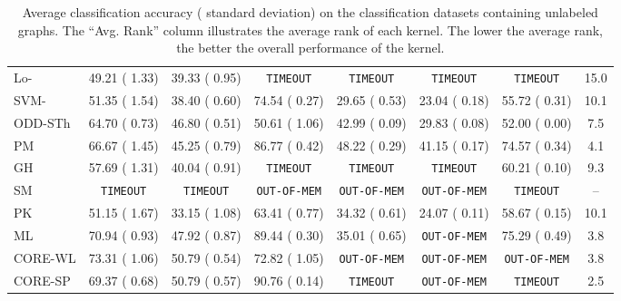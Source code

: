 \documentclass[twoside,11pt]{article}
\begin{document}
\begin{table}[t]
\begin{sc}
{\begin{tabular}{lccccccc}
Lo- & 49.21 {\tiny ( 1.33)} & 39.33 {\tiny ( 0.95)} & \texttt{TIMEOUT} & \texttt{TIMEOUT} & \texttt{TIMEOUT} & \texttt{TIMEOUT} & 15.0 \\ 
SVM- & 51.35 {\tiny ( 1.54)} & 38.40 {\tiny ( 0.60)} & 74.54 {\tiny ( 0.27)} & 29.65 {\tiny ( 0.53)} & 23.04 {\tiny ( 0.18)} & 55.72 {\tiny ( 0.31)} & 10.1 \\ 
ODD-STh & 64.70 {\tiny ( 0.73)} & 46.80 {\tiny ( 0.51)} & 50.61 {\tiny ( 1.06)} & 42.99 {\tiny ( 0.09)} & 29.83 {\tiny ( 0.08)} & 52.00 {\tiny ( 0.00)} & 7.5 \\ 
PM & 66.67 {\tiny ( 1.45)} & 45.25 {\tiny ( 0.79)} & 86.77 {\tiny ( 0.42)} & 48.22 {\tiny ( 0.29)} & 41.15 {\tiny ( 0.17)} & 74.57 {\tiny ( 0.34)} & 4.1 \\ 
GH & 57.69 {\tiny ( 1.31)} & 40.04 {\tiny ( 0.91)} & \texttt{TIMEOUT} & \texttt{TIMEOUT} & \texttt{TIMEOUT} & 60.21 {\tiny ( 0.10)} & 9.3 \\ 
SM & \texttt{TIMEOUT} & \texttt{TIMEOUT} & \texttt{OUT-OF-MEM} & \texttt{OUT-OF-MEM} & \texttt{OUT-OF-MEM} & \texttt{TIMEOUT} & -- \\ 
PK & 51.15 {\tiny ( 1.67)} & 33.15 {\tiny ( 1.08)} & 63.41 {\tiny ( 0.77)} & 34.32 {\tiny ( 0.61)} & 24.07 {\tiny ( 0.11)} & 58.67 {\tiny ( 0.15)} & 10.1 \\ 
ML & 70.94 {\tiny ( 0.93)} & 47.92 {\tiny ( 0.87)} & 89.44 {\tiny ( 0.30)} & 35.01 {\tiny ( 0.65)} & \texttt{OUT-OF-MEM} & 75.29 {\tiny ( 0.49)} & 3.8 \\ 
CORE-WL & 73.31 {\tiny ( 1.06)} & 50.79 {\tiny ( 0.54)} & 72.82 {\tiny ( 1.05)} & \texttt{OUT-OF-MEM} & \texttt{OUT-OF-MEM} & \texttt{OUT-OF-MEM} & 3.8 \\ 
CORE-SP & 69.37 {\tiny ( 0.68)} & 50.79 {\tiny ( 0.57)} & 90.76 {\tiny ( 0.14)} & \texttt{TIMEOUT} & \texttt{OUT-OF-MEM} & \texttt{TIMEOUT} & 2.5 \\ 
\hline
\end{tabular}
}
\end{sc}
\caption{Average classification accuracy ( standard deviation) on the  classification datasets containing unlabeled graphs. The ``Avg. Rank'' column illustrates the average rank of each kernel. The lower the average rank, the better the overall performance of the kernel.}
\label{tab:results_unlabeled}
\end{table}
\end{document}
